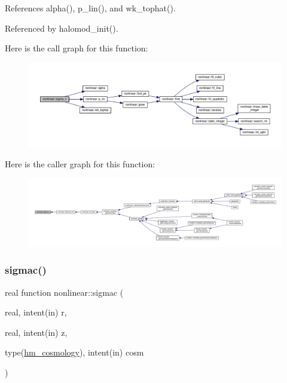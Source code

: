 References alpha(), p\+\_\+lin(), and wk\+\_\+tophat().



Referenced by halomod\+\_\+init().

Here is the call graph for this function\+:
\nopagebreak
\begin{figure}[H]
\begin{center}
\leavevmode
\includegraphics[width=350pt]{namespacenonlinear_a66f93056c25bc48a5cfb206e596b47ad_cgraph}
\end{center}
\end{figure}
Here is the caller graph for this function\+:
\nopagebreak
\begin{figure}[H]
\begin{center}
\leavevmode
\includegraphics[width=350pt]{namespacenonlinear_a66f93056c25bc48a5cfb206e596b47ad_icgraph}
\end{center}
\end{figure}
\mbox{\label{namespacenonlinear_a2b1a2fe15822f8bfcf88ca9de9060e85}} 
\subsubsection{\texorpdfstring{sigmac()}{sigmac()}}
{\footnotesize\ttfamily real function nonlinear\+::sigmac (\begin{DoxyParamCaption}\item[{real, intent(in)}]{r,  }\item[{real, intent(in)}]{z,  }\item[{type(\mbox{\hyperlink{structnonlinear_1_1hm__cosmology}{hm\+\_\+cosmology}}), intent(in)}]{cosm }\end{DoxyParamCaption})\hspace{0.3cm}{\ttfamily [private]}}



